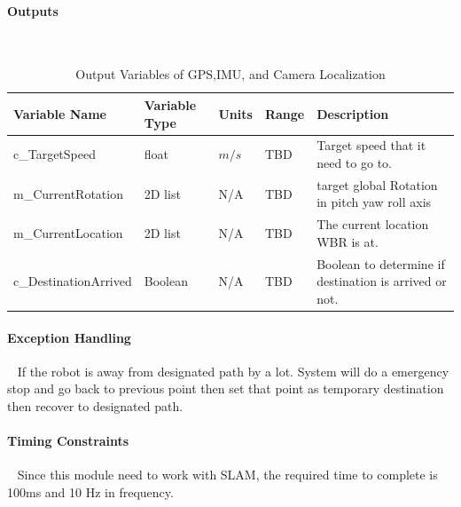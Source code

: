 \documentclass[12pt]{article}
\begin{document}
            \paragraph{Outputs}
                ~\newline
                \begin{table}[H]
                  \centering
                    \caption{Output Variables of GPS,IMU, and Camera Localization} 
                    \label{tbl:Output Variables of GPS,IMU, and Camera Localization}
                  \begin{tabularx}{\textwidth}{|p{5cm}|p{2cm}|p{1.2cm}|p{1cm}|X|}
                    \hline Variable Name & Variable Type & Units & Range & Description \\
                    \hline c\_TargetSpeed & float & $m/s$ & TBD & Target speed that it need to go to.\\
                    \hline m\_CurrentRotation & 2D list & N/A & TBD & target global Rotation in pitch yaw roll axis\\
                    \hline m\_CurrentLocation & 2D list &  N/A & TBD & The current location WBR is at.\\
                    \hline c\_DestinationArrived & Boolean &  N/A & TBD & Boolean to determine if destination is arrived or not.\\
                    \hline
                  \end{tabularx}
                \end{table} 
                
            \paragraph{Exception Handling}
                ~\newline
                If the robot is away from designated path by a lot. System will do a emergency stop and go back to previous point then set that point as temporary destination then recover to designated path. 
                
            \paragraph{Timing Constraints}
                ~\newline
                Since this module need to work with SLAM, the required time to complete is 100ms and 10 Hz in frequency.
                
\end{document}
